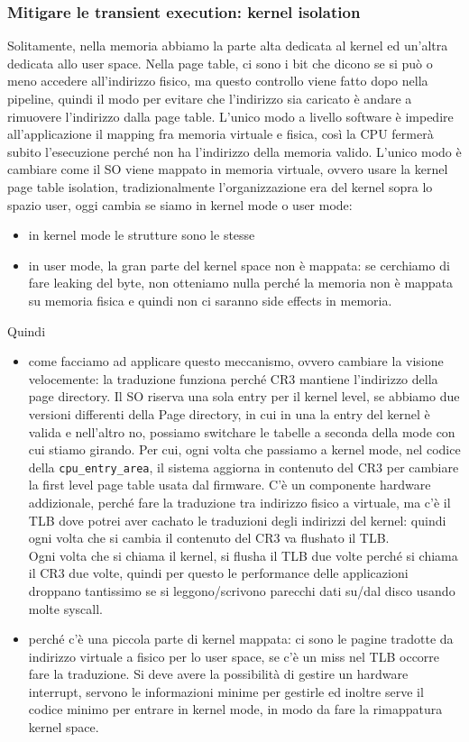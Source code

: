 \documentclass[12pt, oneside]{extbook} %
\begin{document}
\subsubsection{Mitigare le transient execution: kernel isolation}
Solitamente, nella memoria abbiamo la parte alta dedicata al kernel ed un'altra dedicata allo user space. Nella page table, ci sono i bit che dicono se si può o meno accedere all'indirizzo fisico, ma questo controllo viene fatto dopo nella pipeline, quindi il modo per evitare che l'indirizzo sia caricato è andare a rimuovere l'indirizzo dalla page table. L'unico modo a livello software è impedire all'applicazione il mapping fra memoria virtuale e fisica, così la CPU fermerà subito l'esecuzione perché non ha l'indirizzo della memoria valido. L'unico modo è cambiare come il SO viene mappato in memoria virtuale, ovvero usare la kernel page table isolation, tradizionalmente l'organizzazione era del kernel sopra lo spazio user, oggi cambia se siamo in kernel mode o user mode:
\begin{itemize}
\item in kernel mode le strutture sono le stesse
\item in user mode, la gran parte del kernel space non è mappata: se cerchiamo di fare leaking del byte, non otteniamo nulla perché la memoria non è mappata su memoria fisica e quindi non ci saranno side effects in memoria.
\end{itemize}
Quindi
\begin{itemize}
\item come facciamo ad applicare questo meccanismo, ovvero cambiare la visione velocemente: la traduzione funziona perché CR3 mantiene l'indirizzo della page directory. Il SO riserva una sola entry per il kernel level, se abbiamo due versioni differenti della Page directory, in cui in una la entry del kernel è valida e nell'altro no, possiamo switchare le tabelle a seconda della mode con cui stiamo girando. Per cui, ogni volta che passiamo a kernel mode, nel codice della \texttt{cpu\_entry\_area}, il sistema aggiorna in contenuto del CR3 per cambiare la first level page table usata dal firmware. C'è un componente hardware addizionale, perché fare la traduzione tra indirizzo fisico a virtuale, ma c'è il TLB dove potrei aver cachato le traduzioni degli indirizzi del kernel: quindi ogni volta che si cambia il contenuto del CR3 va flushato il TLB.\\Ogni volta che si chiama il kernel, si flusha il TLB due volte perché si chiama il CR3 due volte, quindi per questo le performance delle applicazioni droppano tantissimo se si leggono/scrivono parecchi dati su/dal disco usando molte syscall.
\item perché c'è una piccola parte di kernel mappata: ci sono le pagine tradotte da indirizzo virtuale a fisico per lo user space, se c'è un miss nel TLB occorre fare la traduzione. Si deve avere la possibilità di gestire un hardware interrupt, servono le informazioni minime per gestirle ed inoltre serve il codice minimo per entrare in kernel mode, in modo da fare la rimappatura kernel space.
\end{itemize}
\end{document}
